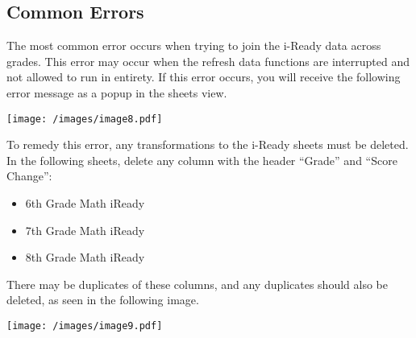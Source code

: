 \documentclass[
  letterpaper,
  DIV=11,
  numbers=noendperiod]{scrartcl}
\providecommand{\tightlist}{%
  \setlength{\itemsep}{0pt}\setlength{\parskip}{0pt}}\usepackage{longtable,booktabs,array}
\begin{document}
\subsection{Common Errors}\label{common-errors}

The most common error occurs when trying to join the i-Ready data across
grades. This error may occur when the refresh data functions are
interrupted and not allowed to run in entirety. If this error occurs,
you will receive the following error message as a popup in the sheets
view.

\texttt{[image: /images/image8.pdf]}

To remedy this error, any transformations to the i-Ready sheets must be
deleted. In the following sheets, delete any column with the header
``Grade'' and ``Score Change'':

\begin{itemize}
\tightlist
\item
  6th Grade Math iReady
\item
  7th Grade Math iReady
\item
  8th Grade Math iReady
\end{itemize}

There may be duplicates of these columns, and any duplicates should also
be deleted, as seen in the following image.

\texttt{[image: /images/image9.pdf]}
\end{document}
